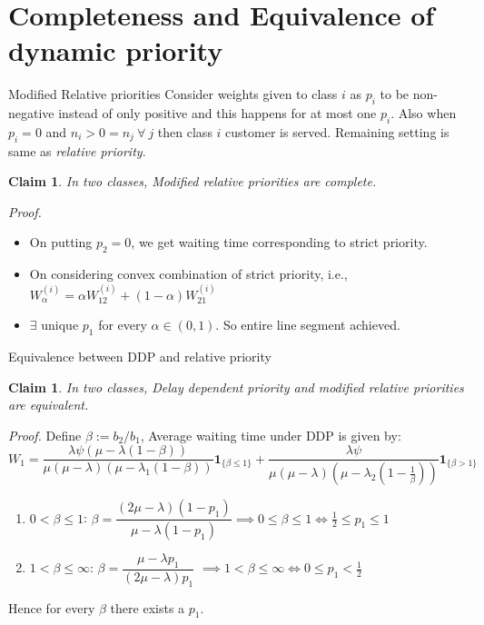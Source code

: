 \documentclass[compress, serif, onlymath, professionalfonts]{beamer}
\newtheorem{defn}{Definition}[section]
\newtheorem{claim}[thm]{Claim}
\begin{document}
\section{Completeness and Equivalence of dynamic priority}
\begin{frame}{Modified Relative priorities}
Consider weights given to class $i$ as $p_i$ to be non-negative instead of only positive and this happens for at most one $p_i$. Also when $p_i = 0$ and $n_i > 0 = n_j~\forall~j$ then class $i$ customer is served. Remaining setting is same as \textit{relative priority}.
\begin{claim}\label{clm:relprt2cls}
 In two classes, Modified relative priorities are complete.
\end{claim}
\textit{Proof.}
\begin{itemize}
\item On putting $p_2=0$, we get waiting time corresponding to strict priority.
\item On considering convex combination of strict priority, i.e., $W_{\alpha}^{(i)} = \alpha W_{12}^{(i)} + (1-\alpha)W_{21}^{(i)}$
\item $\exists$ unique $p_1$ for every $\alpha \in (0,1)$. So entire line segment achieved.
\end{itemize}
\end{frame}
\begin{frame}{Equivalence between DDP and relative priority}
\begin{claim}
In two classes, Delay dependent priority and modified relative priorities are equivalent.
\end{claim}
\textit{Proof.} Define $\beta:= b_2/b_1$, Average waiting time under DDP is given by:
\begin{equation}\nonumber
W_1 = \frac{\lambda \psi (\mu-\lambda(1-\beta))}{\mu(\mu-\lambda)(\mu-\lambda_1(1-\beta))}\mathbf{1}_{\{\beta \leq 1\}}+\frac{\lambda \psi }{\mu(\mu-\lambda)(\mu -\lambda_2(1-\frac{1}{\beta}))}\mathbf{1}_{\{\beta > 1\}}
\label{primary_wait}
\end{equation}\begin{enumerate}
\item $0 < \beta \leq 1$:  $\beta = \dfrac{(2\mu - \lambda)(1 - p_1)}{\mu - \lambda(1 - p_1)} \implies 0 \leq \beta \leq 1 \Leftrightarrow \frac{1}{2} \leq p_1 \leq 1 $
\item $1 < \beta \leq \infty $: $\beta = \dfrac{\mu -\lambda p_1}{(2\mu -\lambda)p_1}$ $\implies 1 < \beta \leq \infty \Leftrightarrow 0 \leq p_1 < \frac{1}{2}$
\end{enumerate}
Hence for every $\beta$ there exists a $p_1$.
\end{frame}
\end{document}
